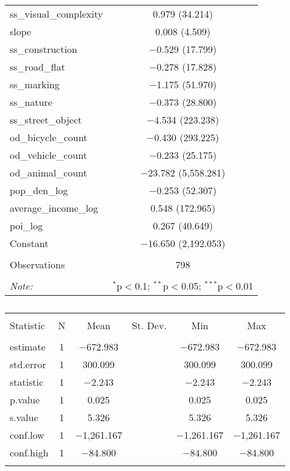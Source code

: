 \begin{table}[!htbp]
\begin{tabular}{@{\extracolsep{1pt}}lc}
  ss\_visual\_complexity & 0.979 (34.214) \\ 
  slope & 0.008 (4.509) \\ 
  ss\_construction & $-$0.529 (17.799) \\ 
  ss\_road\_flat & $-$0.278 (17.828) \\ 
  ss\_marking & $-$1.175 (51.970) \\ 
  ss\_nature & $-$0.373 (28.800) \\ 
  ss\_street\_object & $-$4.534 (223.238) \\ 
  od\_bicycle\_count & $-$0.430 (293.225) \\ 
  od\_vehicle\_count & $-$0.233 (25.175) \\ 
  od\_animal\_count & $-$23.782 (5,558.281) \\ 
  pop\_den\_log & $-$0.253 (52.307) \\ 
  average\_income\_log & 0.548 (172.965) \\ 
  poi\_log & 0.267 (40.649) \\ 
  Constant & $-$16.650 (2,192.053) \\ 
 \hline \\[-1.8ex] 
Observations & 798 \\ 
\hline 
\hline \\[-1.8ex] 
\textit{Note:}  & \multicolumn{1}{r}{$^{*}$p$<$0.1; $^{**}$p$<$0.05; $^{***}$p$<$0.01} \\ 
\end{tabular} 
\end{table} 

\begin{table}[!htbp] \centering 
  \caption{} 
  \label{} 
\small 
\begin{tabular}{@{\extracolsep{1pt}}lccccc} 
\\[-1.8ex]\hline 
\hline \\[-1.8ex] 
Statistic & \multicolumn{1}{c}{N} & \multicolumn{1}{c}{Mean} & \multicolumn{1}{c}{St. Dev.} & \multicolumn{1}{c}{Min} & \multicolumn{1}{c}{Max} \\ 
\hline \\[-1.8ex] 
estimate & 1 & $-$672.983 &  & $-$672.983 & $-$672.983 \\ 
std.error & 1 & 300.099 &  & 300.099 & 300.099 \\ 
statistic & 1 & $-$2.243 &  & $-$2.243 & $-$2.243 \\ 
p.value & 1 & 0.025 &  & 0.025 & 0.025 \\ 
s.value & 1 & 5.326 &  & 5.326 & 5.326 \\ 
conf.low & 1 & $-$1,261.167 &  & $-$1,261.167 & $-$1,261.167 \\ 
conf.high & 1 & $-$84.800 &  & $-$84.800 & $-$84.800 \\ 
\hline \\[-1.8ex] 
\end{tabular} 
\end{table} 

